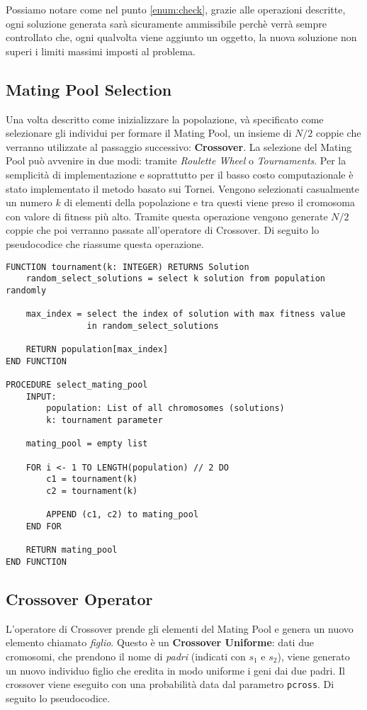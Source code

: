 Possiamo notare come nel punto \ref{enum:check}, grazie alle operazioni
descritte, ogni soluzione generata sarà sicuramente ammissibile perchè verrà
sempre controllato che, ogni qualvolta viene aggiunto un oggetto, la nuova
soluzione non superi i limiti massimi imposti al problema.

\subsection{Mating Pool Selection}
Una volta descritto come inizializzare la popolazione, và specificato come
selezionare gli individui per formare il Mating Pool, un insieme di $N/2$ coppie
che verranno utilizzate al passaggio successivo: \textbf{Crossover}. La
selezione del Mating Pool può avvenire in due modi: tramite \textit{Roulette
    Wheel} o \textit{Tournaments}. Per la semplicità di implementazione e
soprattutto per il basso costo computazionale è stato implementato il metodo
basato sui Tornei. Vengono selezionati casualmente un numero $k$ di elementi
della popolazione e tra questi viene preso il cromosoma con valore di fitness
più alto. Tramite questa operazione vengono generate $N/2$ coppie che poi verranno
passate all'operatore di Crossover.
Di seguito lo pseudocodice che riassume questa operazione.

\begin{lstlisting}[caption={Implementazione del metodo per la selezione del Mating Pool basata sui Tornei.}]
FUNCTION tournament(k: INTEGER) RETURNS Solution
    random_select_solutions = select k solution from population randomly

    max_index = select the index of solution with max fitness value
                in random_select_solutions

    RETURN population[max_index]
END FUNCTION

PROCEDURE select_mating_pool
    INPUT:
        population: List of all chromosomes (solutions)
        k: tournament parameter

    mating_pool = empty list

    FOR i <- 1 TO LENGTH(population) // 2 DO
        c1 = tournament(k)
        c2 = tournament(k)

        APPEND (c1, c2) to mating_pool
    END FOR

    RETURN mating_pool
END FUNCTION
\end{lstlisting}

\subsection{Crossover Operator}
L'operatore di Crossover prende gli elementi del Mating Pool e genera un nuovo
elemento chiamato \textit{figlio}. Questo è un \textbf{Crossover Uniforme}: dati
due cromosomi, che prendono il nome di \textit{padri} (indicati con $s_1$ e
$s_2$), viene generato un nuovo individuo figlio che eredita in modo uniforme i
geni dai due padri. Il crossover viene eseguito con una probabilità data dal
parametro \verb|pcross|. Di seguito lo pseudocodice.

